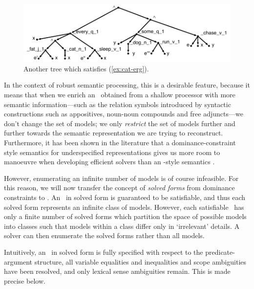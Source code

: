 \begin{figure}
  \centering
  \includegraphics[width=\columnwidth]{pic-more-stuff}
  \caption{Another tree which satisfies (\ref{ex:cat-erg}).}
  \label{fig:fat-black-cat}
\end{figure}

In the context of robust semantic processing, this is a desirable
feature, because it means that when we enrich an \rmrs\ obtained from
a shallow processor with more semantic information---such as the
relation symbols introduced by syntactic constructions such as
appositives, noun-noun compounds and free adjuncts---we don't change
the set of models; we only \emph{restrict} the set of models further
and further towards the semantic representation we are trying to
reconstruct.  Furthermore, it has been shown in the literature that a
dominance-constraint style semantics for underspecified
representations gives us more room to manoeuvre when developing
efficient solvers than an \mrs-style semantics
\cite{Althaus_etal:JoA}.

However, enumerating an infinite number of models is of course
infeasible.  For this reason, we will now transfer the concept of
\emph{solved forms} from dominance constraints to \rmrs.  An \rmrs\ in
solved form is guaranteed to be satisfiable, and thus each solved form
represents an infinite class of models.  However, each satisfiable
\rmrs\ has only a finite number of solved forms which partition the
space of possible models into classes such that models within a class
differ only in `irrelevant' details.  A solver can then enumerate the
solved forms 
rather than all models.

Intuitively, an \rmrs\ in solved form is fully
specified with respect to the predicate-argument structure, all
variable equalities and inequalities and scope ambiguities have been
resolved, and only lexical sense ambiguities remain.  This is made
precise below.

